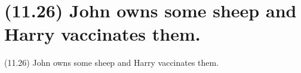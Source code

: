 \documentclass{article}
\begin{document}
\clearpage

%
%

\section*{(11.26) John owns some sheep and Harry vaccinates them.}

\bigbreak
\begin{enumerate*}
\item[(11.26)] John owns some sheep and Harry vaccinates them.
\end{enumerate*}
\bigbreak
\end{document}
